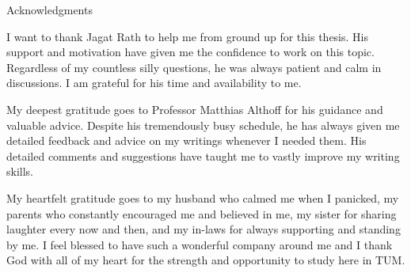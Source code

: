 \thispagestyle{empty}

\vspace*{2cm}

\begin{center}
{ Acknowledgments}
\end{center}

\vspace{1cm}

I want to thank Jagat Rath to help me from ground up for this thesis. His support and motivation have given me the confidence to work on this topic. Regardless of my countless silly questions, he was always patient and calm in discussions. I am grateful for his time and availability to me.

My deepest gratitude goes to Professor Matthias Althoff for his guidance and valuable advice. Despite his tremendously busy schedule, he has always given me detailed feedback and advice on my writings whenever I needed them. His detailed comments and suggestions have taught me to vastly improve my writing skills. 

My heartfelt gratitude goes to my husband who calmed me when I panicked, my parents who constantly encouraged me and believed in me, my sister for sharing laughter every now and then, and my in-laws for always supporting and standing by me. I feel blessed to have such a wonderful company around me and I thank God with all of my heart for the strength and opportunity to study here in TUM.

\cleardoublepage{}
